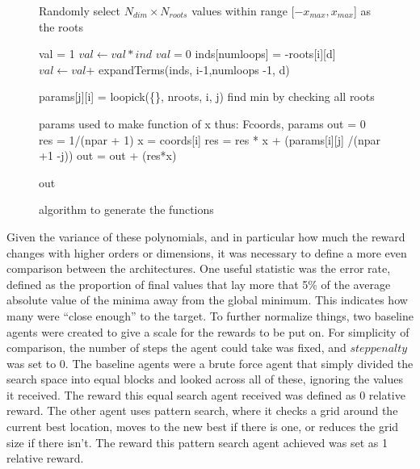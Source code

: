 \begin{figure}
\begin{algorithmic}
\State Randomly select  $N_{dim}\times N_{roots}$ values within range [$-x_{max}, x_{max}$] as the roots

               \State val = 1
                    \State$ val \gets val*ind$
                \EndFor
               \State {}
            \Else
                \State $val = 0$
                    \State inds[numloops] = -roots[i][d]  
                    \State$ val \gets val $+ expandTerms(inds, i-1,numloops -1, d) 
                \EndFor
                \State {}
            \EndIf
      \EndFunction
        
            \State params[j][i] = loopick(\{\}, nroots, i, j)
        \EndFor
    \EndFor
   \State find min by checking all roots
    
  \State params used to make function of x thus:
  \Function F{coords, params}
    \State out = 0
         \State res = 1/(npar + 1)   
        \State x = coords[i]
              \State res = res * x + (params[i][j] /(npar +1 -j))
	    \EndFor
	   \State out =  out + (res*x)
    \EndFor

    \Return out
\EndFunction
\end{algorithmic}
\caption{algorithm to generate the functions}
\label{alg:functiongen}
\end{figure}

Given the variance of these polynomials, and in particular how much the reward changes with higher orders or dimensions, it was necessary to define a more even comparison between the architectures. One useful statistic was the error rate, defined as the proportion of final values that lay more that 5\% of the average absolute value of the minima away from the global minimum. This indicates how many were ``close enough'' to the target. To further normalize things, two baseline agents were created to give a scale for the rewards to be put on. For simplicity of comparison, the number of steps the agent could take was fixed, and $steppenalty$ was set to 0. The baseline agents were a brute force agent that simply divided the search space into equal blocks and looked across all of these, ignoring the values it received. The reward this equal search agent received was defined as 0 relative reward. The other agent uses pattern search, where it checks a grid around the current best location, moves to the new best if there is one, or reduces the grid size if there isn't. The reward this pattern search agent achieved was set as 1 relative reward.

